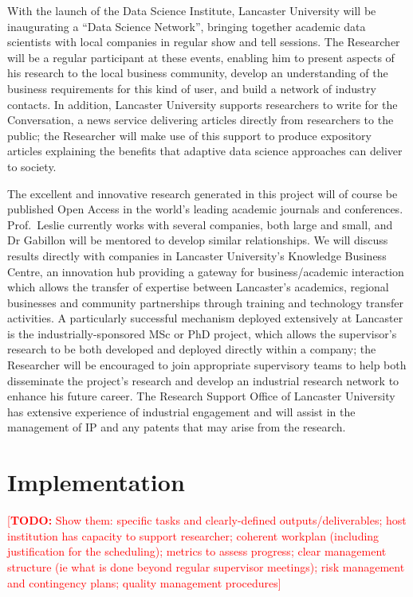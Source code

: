 \documentclass[a4paper,11pt]{article}
\newcommand{\TODO}[1]{{\textcolor{red}{[\textbf{TODO:} #1]}}}
\begin{document}
With the launch of the Data Science Institute, Lancaster University will be inaugurating a ``Data Science Network'', bringing together academic data scientists with local companies in regular show and tell sessions.  The Researcher will be a regular participant at these events, enabling him to present aspects of his research to the local business community, develop an understanding of the business requirements for this kind of user, and build a network of industry contacts.  In addition, Lancaster University supports researchers to write for the Conversation, a news  service delivering articles directly from researchers to the public; the Researcher will make use of this support to produce expository articles explaining the benefits that adaptive data science approaches can deliver to society.

The excellent and innovative research generated in this project will of course be published Open Access in the world's leading academic journals and conferences.  Prof.\ Leslie currently works with several companies, both large and small, and Dr Gabillon will be mentored to develop similar relationships.  We will discuss results directly with companies in Lancaster University's Knowledge Business Centre, an innovation hub providing a gateway for business/academic interaction which allows the transfer of expertise between Lancaster's academics, regional businesses and community partnerships through training and technology transfer activities.  A particularly successful mechanism deployed extensively at Lancaster is the industrially-sponsored MSc or PhD project, which allows the supervisor's research to be both developed and deployed directly within a company; the Researcher will be encouraged to join appropriate supervisory teams to help both disseminate the project's research and develop an industrial research network to enhance his future career.  The Research Support Office of Lancaster University has extensive experience of industrial engagement and will assist in the management of IP and any patents that may arise from the research.

\section{Implementation}
\label{sec:implementation}

\TODO{Show them: specific tasks and clearly-defined outputs/deliverables; host institution has capacity to support researcher; coherent workplan (including justification for the scheduling); metrics to assess progress; clear management structure (ie what is done beyond regular supervisor meetings); risk management and contingency plans; quality management procedures}
\end{document}
